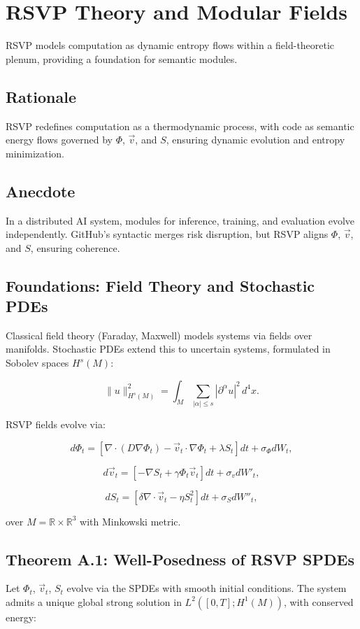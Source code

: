 \section{RSVP Theory and Modular Fields}
\label{sec:chapter2}

RSVP models computation as dynamic entropy flows within a field-theoretic plenum, providing a foundation for semantic modules.

\subsection{Rationale}
RSVP redefines computation as a thermodynamic process, with code as semantic energy flows governed by $\Phi$, $\vec{v}$, and $S$, ensuring dynamic evolution and entropy minimization.

\subsection{Anecdote}
In a distributed AI system, modules for inference, training, and evaluation evolve independently. GitHub’s syntactic merges risk disruption, but RSVP aligns $\Phi$, $\vec{v}$, and $S$, ensuring coherence.

\subsection{Foundations: Field Theory and Stochastic PDEs}
Classical field theory (Faraday, Maxwell) models systems via fields over manifolds. Stochastic PDEs \cite{daprato2014stochastic} extend this to uncertain systems, formulated in Sobolev spaces $H^s(M)$:

\[
\|u\|_{H^s(M)}^2 = \int_M \sum_{|\alpha| \leq s} |\partial^\alpha u|^2 \, d^4x.
\]

RSVP fields evolve via:

\[
d\Phi_t = \left[ \nabla \cdot (D \nabla \Phi_t) - \vec{v}_t \cdot \nabla \Phi_t + \lambda S_t \right] dt + \sigma_\Phi dW_t,
\]

\[
d\vec{v}_t = \left[ -\nabla S_t + \gamma \Phi_t \vec{v}_t \right] dt + \sigma_v dW'_t,
\]

\[
dS_t = \left[ \delta \nabla \cdot \vec{v}_t - \eta S_t^2 \right] dt + \sigma_S dW''_t,
\]

over $M = \mathbb{R} \times \mathbb{R}^3$ with Minkowski metric.

\subsection{Theorem A.1: Well-Posedness of RSVP SPDEs}
Let $\Phi_t$, $\vec{v}_t$, $S_t$ evolve via the SPDEs with smooth initial conditions. The system admits a unique global strong solution in $L^2([0,T]; H^1(M))$, with conserved energy:

